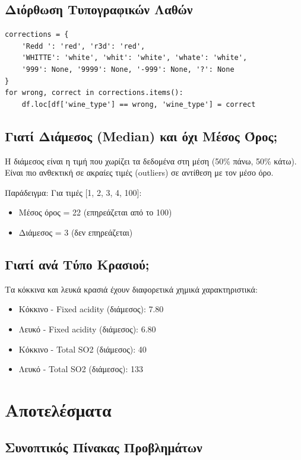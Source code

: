 \documentclass[12pt,a4paper]{article}
\begin{document}
\subsection{Διόρθωση Τυπογραφικών Λαθών}

\begin{lstlisting}
corrections = {
    'Redd ': 'red', 'r3d': 'red',
    'WHITTE': 'white', 'whit': 'white', 'whate': 'white',
    '999': None, '9999': None, '-999': None, '?': None
}
for wrong, correct in corrections.items():
    df.loc[df['wine_type'] == wrong, 'wine_type'] = correct
\end{lstlisting}

\subsection{Γιατί Διάμεσος (Median) και όχι Μέσος Όρος;}

Η διάμεσος είναι η τιμή που χωρίζει τα δεδομένα στη μέση (50\% πάνω, 50\% κάτω). Είναι πιο ανθεκτική σε ακραίες τιμές (outliers) σε αντίθεση με τον μέσο όρο.

Παράδειγμα: Για τιμές [1, 2, 3, 4, 100]:
\begin{itemize}
    \item Μέσος όρος = 22 (επηρεάζεται από το 100)
    \item Διάμεσος = 3 (δεν επηρεάζεται)
\end{itemize}

\subsection{Γιατί ανά Τύπο Κρασιού;}

Τα κόκκινα και λευκά κρασιά έχουν διαφορετικά χημικά χαρακτηριστικά:

\begin{itemize}
    \item Κόκκινο - Fixed acidity (διάμεσος): 7.80
    \item Λευκό - Fixed acidity (διάμεσος): 6.80
    \item Κόκκινο - Total SO2 (διάμεσος): 40
    \item Λευκό - Total SO2 (διάμεσος): 133
\end{itemize}

\section{Αποτελέσματα}

\subsection{Συνοπτικός Πίνακας Προβλημάτων}
\end{document}

